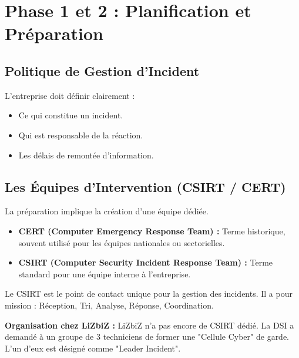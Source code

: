 \section{Phase 1 et 2 : Planification et Préparation}

\subsection{Politique de Gestion d'Incident}

L'entreprise doit définir clairement :
\begin{itemize}
    \item Ce qui constitue un incident.
    \item Qui est responsable de la réaction.
    \item Les délais de remontée d'information.
\end{itemize}

\subsection{Les Équipes d'Intervention (CSIRT / CERT)}

La préparation implique la création d'une équipe dédiée.

\begin{boxdef}
\begin{itemize}
    \item \textbf{CERT (Computer Emergency Response Team) :} Terme historique, souvent utilisé pour les équipes nationales ou sectorielles.
    \item \textbf{CSIRT (Computer Security Incident Response Team) :} Terme standard pour une équipe interne à l'entreprise.
\end{itemize}
\end{boxdef}

Le CSIRT est le point de contact unique pour la gestion des incidents. Il a pour mission : Réception, Tri, Analyse, Réponse, Coordination.

\begin{boxlizbiz}
\textbf{Organisation chez LiZbiZ :}
LiZbiZ n'a pas encore de CSIRT dédié. La DSI a demandé à un groupe de 3 techniciens de former une "Cellule Cyber" de garde. L'un d'eux est désigné comme "Leader Incident".
\end{boxlizbiz}

